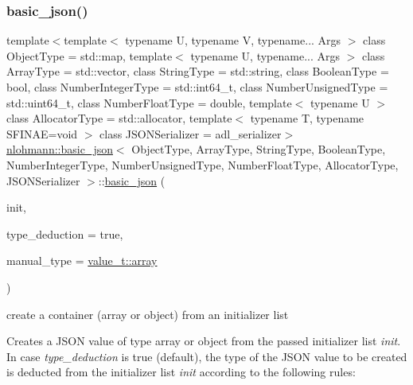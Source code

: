 \subsubsection{\texorpdfstring{basic\_json()}{basic\_json()}\hspace{0.1cm}{\footnotesize\ttfamily [4/9]}}
{\footnotesize\ttfamily template$<$template$<$ typename U, typename V, typename... Args $>$ class Object\+Type = std\+::map, template$<$ typename U, typename... Args $>$ class Array\+Type = std\+::vector, class String\+Type  = std\+::string, class Boolean\+Type  = bool, class Number\+Integer\+Type  = std\+::int64\+\_\+t, class Number\+Unsigned\+Type  = std\+::uint64\+\_\+t, class Number\+Float\+Type  = double, template$<$ typename U $>$ class Allocator\+Type = std\+::allocator, template$<$ typename T, typename S\+F\+I\+N\+A\+E=void $>$ class J\+S\+O\+N\+Serializer = adl\+\_\+serializer$>$ \\
\mbox{\hyperlink{classnlohmann_1_1basic__json}{nlohmann\+::basic\+\_\+json}}$<$ Object\+Type, Array\+Type, String\+Type, Boolean\+Type, Number\+Integer\+Type, Number\+Unsigned\+Type, Number\+Float\+Type, Allocator\+Type, J\+S\+O\+N\+Serializer $>$\+::\mbox{\hyperlink{classnlohmann_1_1basic__json}{basic\+\_\+json}} (\begin{DoxyParamCaption}\item[{std\+::initializer\+\_\+list$<$ \mbox{\hyperlink{classnlohmann_1_1basic__json}{basic\+\_\+json}}$<$ Object\+Type, Array\+Type, String\+Type, Boolean\+Type, Number\+Integer\+Type, Number\+Unsigned\+Type, Number\+Float\+Type, Allocator\+Type, J\+S\+O\+N\+Serializer $>$ $>$}]{init,  }\item[{bool}]{type\+\_\+deduction = {\ttfamily true},  }\item[{\mbox{\hyperlink{namespacenlohmann_1_1detail_a90aa5ef615aa8305e9ea20d8a947980f}{value\+\_\+t}}}]{manual\+\_\+type = {\ttfamily \mbox{\hyperlink{namespacenlohmann_1_1detail_a90aa5ef615aa8305e9ea20d8a947980faf1f713c9e000f5d3f280adbd124df4f5}{value\+\_\+t\+::array}}} }\end{DoxyParamCaption})\hspace{0.3cm}{\ttfamily [inline]}}



create a container (array or object) from an initializer list 

Creates a J\+S\+ON value of type array or object from the passed initializer list {\itshape init}. In case {\itshape type\+\_\+deduction} is {\ttfamily true} (default), the type of the J\+S\+ON value to be created is deducted from the initializer list {\itshape init} according to the following rules\+:



